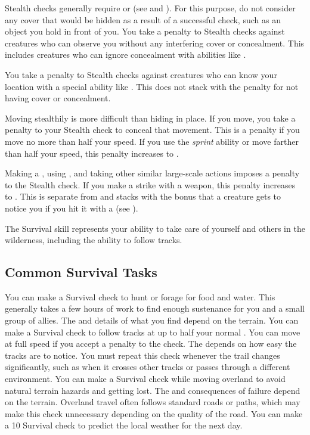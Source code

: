     Stealth checks generally require  or  (see  and ).
    For this purpose, do not consider any cover that would be hidden as a result of a successful check, such as an object you hold in front of you.
    You take a  penalty to Stealth checks against creatures who can observe you without any interfering cover or concealment.
    This includes creatures who can ignore concealment with abilities like .

    You take a  penalty to Stealth checks against creatures who can know your location with a special ability like .
    This does not stack with the penalty for not having cover or concealment.

    Moving stealthily is more difficult than hiding in place.
    If you move, you take a penalty to your Stealth check to conceal that movement.
    This is a  penalty if you move no more than half your speed.
    If you use the \textit{sprint} ability or move farther than half your speed, this penalty increases to .

    Making a , using , and taking other similar large-scale actions imposes a  penalty to the Stealth check.
    If you make a strike with a  weapon, this penalty increases to .
    This is separate from and stacks with the  bonus that a creature gets to notice you if you hit it with a  (see ).

\newpage
{}
  The Survival skill represents your ability to take care of yourself and others in the wilderness, including the ability to follow tracks.

  \subsection{Common Survival Tasks}
     You can make a Survival check to hunt or forage for food and water.
    This generally takes a few hours of work to find enough sustenance for you and a small group of allies.
    The  and details of what you find depend on the terrain.
     You can make a Survival check to follow tracks at up to half your normal .
    You can move at full speed if you accept a  penalty to the check.
    The  depends on how easy the tracks are to notice.
    You must repeat this check whenever the trail changes significantly, such as when it crosses other tracks or passes through a different environment.
     You can make a Survival check while moving overland to avoid natural terrain hazards and getting lost.
    The  and consequences of failure depend on the terrain.
    Overland travel often follows standard roads or paths, which may make this check unnecessary depending on the quality of the road.
     You can make a  10 Survival check to predict the local weather for the next day.

